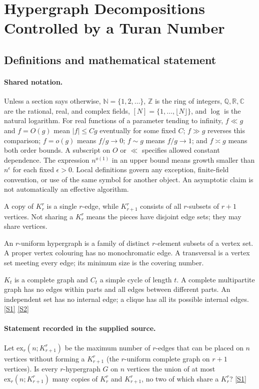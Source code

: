 \documentclass[11pt,a4paper]{article}
\newcommand{\N}{\mathbb{N}}
\newcommand{\Z}{\mathbb{Z}}
\newcommand{\Q}{\mathbb{Q}}
\newcommand{\R}{\mathbb{R}}
\newcommand{\C}{\mathbb{C}}
\newcommand{\sref}[2]{\hyperlink{source:#1:#2}{[S#2]}}
\begin{document}
\section{Hypergraph Decompositions Controlled by a Turan Number}\label{statement}


\subsection{Definitions and mathematical statement}

\paragraph{Shared notation.}Unless a section says otherwise, $\N=\{1,2,\ldots\}$,
$\Z$ is the ring of integers, $\Q,\R,\C$ are the rational, real, and complex
fields, $[N]=\{1,\ldots,\lfloor N\rfloor\}$, and $\log$ is the natural
logarithm. For real functions of a parameter tending to infinity,
$f\ll g$ and $f=O(g)$ mean $|f|\leq Cg$ eventually for some fixed $C$;
$f\gg g$ reverses this comparison; $f=o(g)$ means $f/g\to0$;
$f\sim g$ means $f/g\to1$; and $f\asymp g$ means both order bounds.
A subscript on $O$ or $\ll$ specifies allowed constant dependence.
The expression $n^{o(1)}$ in an upper bound means growth smaller than
$n^\epsilon$ for each fixed $\epsilon>0$. Local definitions govern any
exception, finite-field convention, or use of the same symbol for another
object. An asymptotic claim is not automatically an effective algorithm.



A copy of $K_r^r$ is a single $r$-edge, while $K_{r+1}^r$ consists of all $r$-subsets of $r+1$ vertices. Not sharing a $K_r^r$ means the pieces have disjoint edge sets; they may share vertices.

An $r$-uniform hypergraph is a family of distinct $r$-element subsets of a vertex set. A proper vertex colouring has no monochromatic edge. A transversal is a vertex set meeting every edge; its minimum size is the covering number.

$K_t$ is a complete graph and $C_t$ a simple cycle of length $t$. A complete multipartite graph has no edges within parts and all edges between different parts. An independent set has no internal edge; a clique has all its possible internal edges. \sref{statement}{1} \sref{statement}{2}

\paragraph{Statement recorded in the supplied source.}
Let $\mathrm{ex}_r(n;K_{r+1}^r)$ be the maximum number of $r$-edges that can be placed on $n$ vertices without forming a $K_{r+1}^r$ (the $r$-uniform complete graph on $r+1$ vertices).
Is every $r$-hypergraph $G$ on $n$ vertices the union of at most $\mathrm{ex}_{r}(n;K_{r+1}^r)$ many copies of $K_r^r$ and $K_{r+1}^r$, no two of which share a $K_r^r$? \sref{statement}{1}
\end{document}
